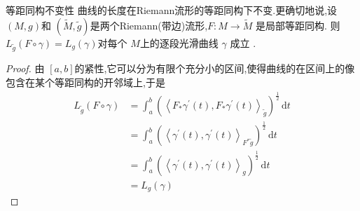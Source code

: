 \documentclass[../../几何与拓扑.tex]{subfiles}
\begin{document}
\begin{proposition}{等距同构不变性}
    曲线的长度在Riemann流形的等距同构下不变.更确切地说,设 $ \left(M,g \right)  $和 $ \left( \tilde{M},\tilde{g} \right)  $是两个Riemann(带边)流形,$F:M\to \tilde{M} $   是局部等距同构.
    则 $ L_{\tilde{g}}\left( F\circ \gamma \right)   = L_{g}\left( \gamma \right) $对每个 $ M $上的逐段光滑曲线 $ \gamma $ 成立 . 
\end{proposition}
\begin{proof}
 由 $ [a,b] $的紧性,它可以分为有限个充分小的区间,使得曲线的在区间上的像包含在某个等距同构的开邻域上,于是 
    $$
    \begin{aligned}
    L_{ \tilde{g}} \left( F\circ \gamma \right) & = \int_{a}^{b} \left(  \left< F_{*} \gamma^{\prime} \left( t \right), F_{*} \gamma^{\prime} \left( t \right)   \right>_{ \tilde{g}} \right)^{\frac{1}{2}}   \,\mathrm{d} t\\ 
     & = \int_{a}^{b}\left( \left<\gamma^{\prime} \left( t \right),\gamma^{\prime} \left( t \right)   \right>_{F^{*} \tilde{g} } \right)^{\frac{1}{2}}  \,\mathrm{d} t\\ 
      & = \int_{a}^{b} \left( \left<\gamma^{\prime} \left( t \right),\gamma^{\prime} \left( t \right)   \right>_{ g} \right)^{ \frac{1}{2}} \,\mathrm{d} t\\ 
       & = L_{g}\left( \gamma \right) 
    \end{aligned}
    $$
\end{proof}
\end{document}
